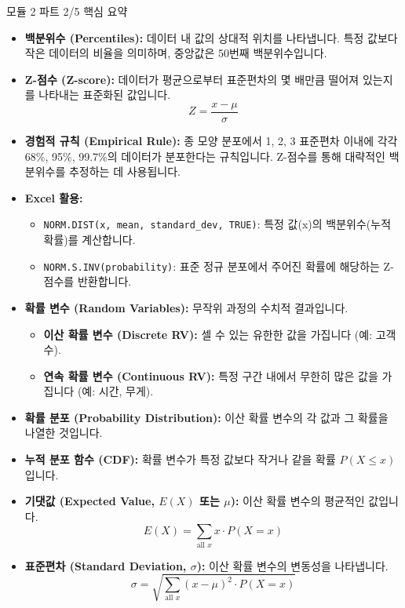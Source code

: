 \documentclass[11pt,a4paper]{article}
\theoremstyle{definition}
\begin{document}
\begin{infobox}{모듈 2 파트 2/5 핵심 요약}
\begin{itemize}
    \item \textbf{백분위수 (Percentiles):} 데이터 내 값의 상대적 위치를 나타냅니다. 특정 값보다 작은 데이터의 비율을 의미하며, 중앙값은 50번째 백분위수입니다.
    \item \textbf{Z-점수 (Z-score):} 데이터가 평균으로부터 표준편차의 몇 배만큼 떨어져 있는지를 나타내는 표준화된 값입니다.
    \[ Z = \frac{x - \mu}{\sigma} \]
    \item \textbf{경험적 규칙 (Empirical Rule):} 종 모양 분포에서 1, 2, 3 표준편차 이내에 각각 68\%, 95\%, 99.7\%의 데이터가 분포한다는 규칙입니다. Z-점수를 통해 대략적인 백분위수를 추정하는 데 사용됩니다.
    \item \textbf{Excel 활용:}
    \begin{itemize}
        \item \texttt{NORM.DIST(x, mean, standard\_dev, TRUE)}: 특정 값(x)의 백분위수(누적 확률)를 계산합니다.
        \item \texttt{NORM.S.INV(probability)}: 표준 정규 분포에서 주어진 확률에 해당하는 Z-점수를 반환합니다.
    \end{itemize}
    \item \textbf{확률 변수 (Random Variables):} 무작위 과정의 수치적 결과입니다.
    \begin{itemize}
        \item \textbf{이산 확률 변수 (Discrete RV):} 셀 수 있는 유한한 값을 가집니다 (예: 고객 수).
        \item \textbf{연속 확률 변수 (Continuous RV):} 특정 구간 내에서 무한히 많은 값을 가집니다 (예: 시간, 무게).
    \end{itemize}
    \item \textbf{확률 분포 (Probability Distribution):} 이산 확률 변수의 각 값과 그 확률을 나열한 것입니다.
    \item \textbf{누적 분포 함수 (CDF):} 확률 변수가 특정 값보다 작거나 같을 확률 \(P(X \le x)\)입니다.
    \item \textbf{기댓값 (Expected Value, \(E(X)\) 또는 \(\mu\)):} 이산 확률 변수의 평균적인 값입니다.
    \[ E(X) = \sum_{\text{all } x} x \cdot P(X=x) \]
    \item \textbf{표준편차 (Standard Deviation, \(\sigma\)):} 이산 확률 변수의 변동성을 나타냅니다.
    \[ \sigma = \sqrt{\sum_{\text{all } x} (x - \mu)^2 \cdot P(X=x)} \]
\end{itemize}
\end{infobox}
\end{document}
